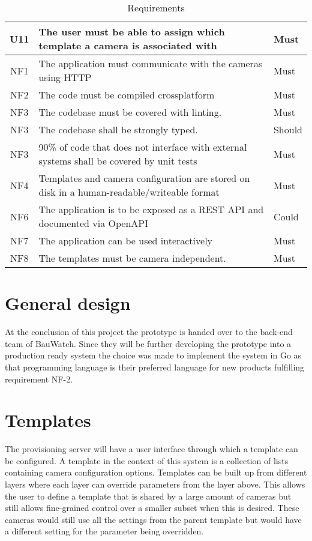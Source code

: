 \begin{table*}[h]
\begin{tabulary}{\linewidth}{CLL}
		\\ \hline
		U11 & The user must be able to assign which template a camera is associated with & Must
        \\ \hline
        NF1 & The application must communicate with the cameras using HTTP & Must
        \\ \hline
        NF2 & The code must be compiled crossplatform & Must
        \\ \hline
        NF3 & The codebase must be covered with linting. & Must
        \\ \hline
        NF3 & The codebase shall be strongly typed. & Should
        \\ \hline
        NF3 & 90\% of code that does not interface with external systems shall be covered by unit tests& Must
        \\ \hline
        NF4 & Templates and camera configuration are stored on disk in a human-readable/writeable format & Must
        \\ \hline
        NF6 & The application is to be exposed as a REST API and documented via OpenAPI & Could
		\\ \hline
		NF7 & The application can be used interactively & Must
        \\ \hline
        NF8 & The templates must be camera independent. & Must
    \end{tabulary}
    \caption{Requirements}
    \label{tab:requirements}
\end{table*}

\section{General design}
At the conclusion of this project the prototype is handed over to the back-end team of BauWatch.
Since they will be further developing the prototype into a production ready system the choice was made to implement the system in Go as that programming language is their preferred language for new products fulfilling requirement NF-2.

\section{Templates}
The provisioning server will have a user interface through which a template can be configured.
A template in the context of this system is a collection of lists containing camera configuration options.
Templates can be built up from different layers where each layer can override parameters from the layer above.
This allows the user to define a template that is shared by a large amount of cameras but still allows fine-grained control over a smaller subset when this is desired.
These cameras would still use all the settings from the parent template but would have a different setting for the parameter being overridden.

